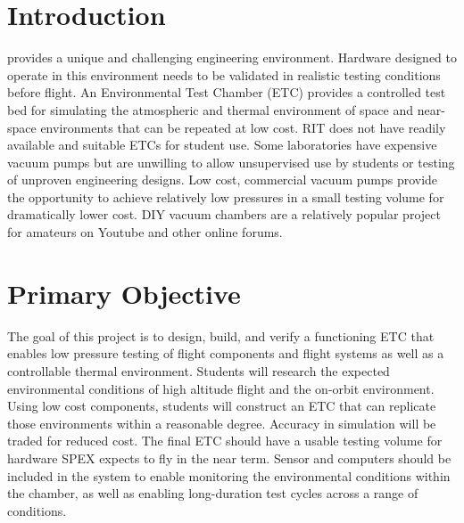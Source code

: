 \documentclass[conference]{IEEEtran} %
\begin{document}

\section{Introduction}
\label{sec:introduction}

 provides a unique and challenging engineering environment.
Hardware designed to operate in this environment needs to be validated in realistic testing conditions before flight.
An Environmental Test Chamber (ETC) provides a controlled test bed for simulating the atmospheric and thermal environment of space and near-space environments that can be repeated at low cost.
RIT does not have readily available and suitable ETCs for student use.
Some laboratories have expensive vacuum pumps but are unwilling to allow unsupervised use by students or testing of unproven engineering designs.
Low cost, commercial vacuum pumps provide the opportunity to achieve relatively low pressures in a small testing volume for dramatically lower cost.
DIY vacuum chambers are a relatively popular project for amateurs on Youtube and other online forums.

\section{Primary Objective}
\label{sec:primary-obj}

  The goal of this project is to design, build, and verify a functioning ETC that enables low pressure testing of flight components and flight systems as well as a controllable thermal environment.
  Students will research the expected environmental conditions of high altitude flight and the on-orbit environment.
  Using low cost components, students will construct an ETC that can replicate those environments within a reasonable degree.
  Accuracy in simulation will be traded for reduced cost.
  The final ETC should have a usable testing volume for hardware SPEX expects to fly in the near term.
  Sensor and computers should be included in the system to enable monitoring the environmental conditions within the chamber, as well as enabling long-duration test cycles across a range of conditions.
\end{document}
